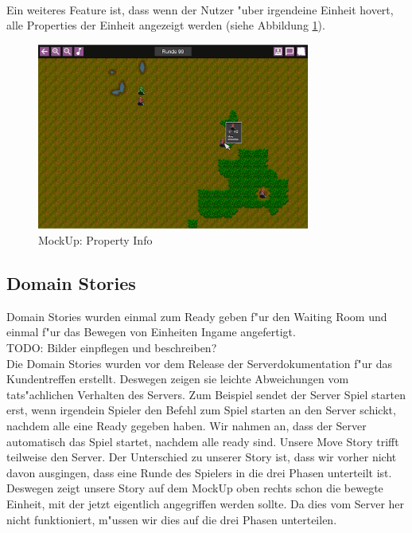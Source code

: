 \documentclass[12pt, titlepage]{scrartcl}
\begin{document}
			        \ \\ Ein weiteres Feature ist, dass wenn der Nutzer "uber irgendeine Einheit hovert, alle Properties der Einheit angezeigt werden (siehe Abbildung \ref{Property_Info}). \\
			        \begin{figure}[H] 
    				    \centering
    				    \includegraphics[width=0.8\textwidth]{images/mockUps/showPropertiesWhenHovered.png}
    				    \caption{MockUp: Property Info}
    				    \label{Property_Info}
			        \end{figure}
		\subsection{Domain Stories}
		    Domain Stories wurden einmal zum Ready geben f"ur den Waiting Room und einmal f"ur das Bewegen von Einheiten Ingame angefertigt. \\
		    TODO: Bilder einpflegen und beschreiben?
		    \ \\ Die Domain Stories wurden vor dem Release der Serverdokumentation f"ur das Kundentreffen erstellt. Deswegen zeigen sie leichte Abweichungen vom tats"achlichen Verhalten des Servers. Zum Beispiel sendet der Server Spiel starten erst, wenn irgendein Spieler den Befehl zum Spiel starten an den Server schickt, nachdem alle eine Ready gegeben haben. Wir nahmen an, dass der Server automatisch das Spiel startet, nachdem alle ready sind. Unsere Move Story trifft teilweise den Server. Der Unterschied zu unserer Story ist, dass wir vorher nicht davon ausgingen, dass eine Runde des Spielers in die drei Phasen unterteilt ist. Deswegen zeigt unsere Story auf dem MockUp oben rechts schon die bewegte Einheit, mit der jetzt eigentlich angegriffen werden sollte. Da dies vom Server her nicht funktioniert, m"ussen wir dies auf die drei Phasen unterteilen.
	\newpage
\end{document}

